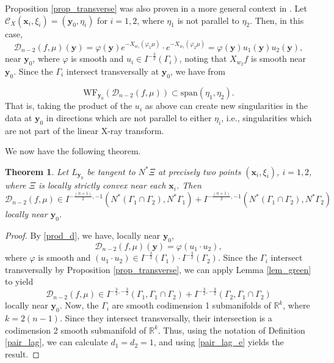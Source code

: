 \documentclass[a4paper,12pt]{amsart}
\numberwithin{equation}{section}
\theoremstyle{plain}
\newtheorem{theorem}{Theorem}
\numberwithin{theorem}{section}
\theoremstyle{definition}
\theoremstyle{remark}
\theoremstyle{remark}
\theoremstyle{remark}
\newcommand{\Cc}{\mathcal{C}}
\newcommand{\WF}{\mathrm{WF}}
\newcommand{\vx}{{\mathbf{x}}}
\newcommand{\vy}{{\mathbf{y}}}
\begin{document}
Proposition \ref{prop_transverse} was also proven in a more general context in \cite[Lemma 4.2]{chihara2026geodesic}. Let $\Cc_X(\vx_i,\xi_i) = (\vy_0,\eta_i)$ for $i = 1,2$, where $\eta_1$ is not parallel to $\eta_2$. Then, in this case,
\begin{equation}\label{prod_d}
\mathcal{D}_{n-2}(f,\mu)(\vy) = \varphi(\vy) e^{-X_{w_1}(\varphi_1\mu)} \cdot e^{-X_{w_1}(\varphi_2\mu)} = \varphi(\vy) u_1(\vy)u_2(\vy),
\end{equation}
near $\vy_0$, where $\varphi$ is smooth and $u_i \in  I^{- \frac{3}{2}}(\Gamma_i)$, noting that $X_{w_2}f$ is smooth near $\vy_0$. Since the $\Gamma_i$ intersect transversally at $\vy_0$, we have from {\cite[Theorem 8.2.10]{hormanderI}
$$\WF_{\vy_0}(\mathcal{D}_{n-2}(f,\mu)) \subset \text{span}(\eta_1,\eta_2).$$
That is, taking the product of the $u_i$ as above can create new singularities in the data at $\vy_0$ in directions which are not parallel to either $\eta_i$, i.e., singularities which are not part of the linear X-ray transform. 

We now have the following theorem.
\begin{theorem}\label{double}
Let $L_{\vy_0}$ be tangent to $N^* \Xi$ at precisely two points $(\vx_i,\xi_i)$, $i = 1,2$, where $\Xi$ is locally strictly convex near each $\vx_i$.%
Then
\begin{equation}
\mathcal{D}_{n-2}(f,\mu) \in I^{- \frac{(n+1)}{2},-1}(N^*(\Gamma_1 \cap \Gamma_2),N^*\Gamma_1) + I^{- \frac{(n+1)}{2},-1}(N^*(\Gamma_1 \cap \Gamma_2),N^*\Gamma_2)
\end{equation}
locally near $\vy_0$.
\end{theorem}
\begin{proof}
By \eqref{prod_d}, we have, locally near $\vy_0$,
\begin{equation}
\mathcal{D}_{n-2}(f,\mu)(\vy) = \varphi (u_1 \cdot u_2),
\end{equation}
where $\varphi$ is smooth and $(u_1 \cdot u_2)\in I^{- \frac{3}{2}}(\Gamma_1) \cdot I^{- \frac{3}{2}}(\Gamma_2)$. Since the $\Gamma_i$ intersect transversally by Proposition \ref{prop_transverse}, we can apply Lemma \ref{lem_green} to yield
\begin{equation}
\mathcal{D}_{n-2}(f,\mu)\in  I^{- \frac{3}{2},- \frac{3}{2}}(\Gamma_1,\Gamma_1 \cap \Gamma_2) + I^{- \frac{3}{2},- \frac{3}{2}}(\Gamma_2, \Gamma_1 \cap \Gamma_2)
\end{equation}
locally near $\vy_0$. Now, the $\Gamma_i$ are smooth codimension 1 submanifolds of $\mathbb{R}^k$, where $k = 2(n-1)$. Since they intersect transversally, their intersection is a codimension 2 smooth submanifold of $\mathbb{R}^k$. Thus, using the notation of Definition \ref{pair_lag}, we can calculate $d_1 = d_2 = 1$, and using \eqref{pair_lag_e} yields the result.
\end{proof}

}
\end{document}

